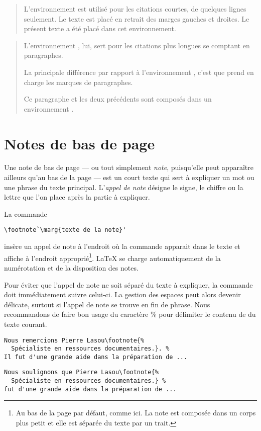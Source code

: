 \begin{quote}
  L'environnement  est utilisé pour les citations courtes,
  de quelques lignes seulement. Le texte est placé en retrait des
  marges gauches et droites. Le présent texte a été placé dans cet
  environnement.
\end{quote}

\begin{quotation}
  L'environnement , lui, sert pour les citations plus
  longues se comptant en paragraphes.

  La principale différence par rapport à l'environnement ,
  c'est que  prend en charge les marques de paragraphes.

  Ce paragraphe et les deux précédents sont composés dans
  un environnement .
\end{quotation}


\section{Notes de bas de page}
\label{sec:apparence:notes}

Une note de bas de page --- ou tout simplement \emph{note},
puisqu'elle peut apparaître ailleurs qu'au bas de la page --- est un
court texte qui sert à expliquer un mot ou une phrase du texte
principal. L'\emph{appel de note} désigne le signe, le chiffre ou la
lettre que l'on place après la partie à expliquer.

La commande
\begin{lstlisting}
\footnote`\marg{texte de la note}'
\end{lstlisting}
insère un appel de note à l'endroit où la commande apparait dans le
texte et affiche  à l'endroit
approprié\footnote{%
  Au bas de la page par défaut, comme ici. La note est composée dans
  un corps plus petit et elle est séparée du texte par un trait.}. %
{\LaTeX} se charge automatiquement de la numérotation et de la
disposition des notes.

Pour éviter que l'appel de note ne soit séparé du texte à expliquer,
la commande \cmd{\footnote} doit immédiatement suivre celui-ci. La
gestion des espaces peut alors devenir délicate, surtout si l'appel de
note se trouve en fin de phrase. Nous recommandons de faire bon usage
du caractère \% pour délimiter le contenu de \cmdprint{\footnote} du
texte courant.
\begin{lstlisting}[emph=footnote]
%% note en fin de phrase
Nous remercions Pierre Lasou\footnote{%
  Spécialiste en ressources documentaires.}. %
Il fut d'une grande aide dans la préparation de ...
\end{lstlisting}
\begin{lstlisting}[emph=footnote]
%% note au fil de la phrase
Nous soulignons que Pierre Lasou\footnote{%
  Spécialiste en ressources documentaires.} %
fut d'une grande aide dans la préparation de ...
\end{lstlisting}

